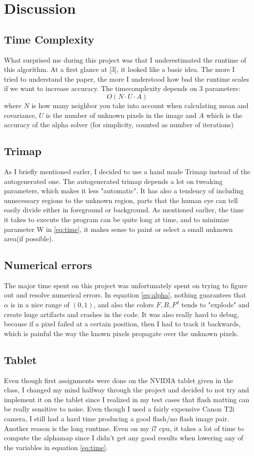 \documentclass[10pt,letterpaper,twocolumn]{article}
\begin{document}
\section{Discussion}
\subsection{Time Complexity}
What surprised me during this project was that I underestimated the runtime of this algorithm. At a first glance at [3], it looked like a basic idea. The more I tried to understand the paper, the more I understood how bad the runtime scales if we want to increase accuracy. The timecomplexity depends on 3 parameters:
	\begin{equation}
O(N\cdot U\cdot A)
\label{eq:time}
	\end{equation}
	where $N$ is how many neighbor you take into account when calculating mean and covariance, $U$ is the number of unknown pixels in the image and $A$ which is the accuracy of the alpha solver (for simplicity, counted as number of iterations)
\subsection{Trimap}
As I briefly mentioned earler, I decided to use a hand made Trimap instead of the autogenerated one. The autogenerated trimap depends a lot on tweaking parameters, which makes it less "automatic". It has also a tendency of including unnecessary regions to the unknown region, parts that the human eye can tell easily divide either in foreground or background. As mentioned earlier, the time it takes to execute the program can be quite long at time, and to minimize parameter W in \ref{eq:time}, it makes sense to paint or select a small unknown area(if possible).
\subsection{Numerical errors}
The major time spent on this project was unfortunately spent on trying to figure out and resolve numerical errors. In equation \ref{eq:alpha}, nothing guarantees that $\alpha$ is in a nice range of $(0,1)$, and also the colors $F,B,F^d$ tends to "explode" and create huge artifacts and crashes in the code. It was also really hard to debug, because if a pixel failed at a certain position, then I had to track it backwards, which is painful the way the known pixels propagate over the unknown pixels.
\subsection{Tablet}
Even though first assignments were done on the NVIDIA tablet given in the class, I changed my mind halfway through the project and decided to not try and implement it on the tablet since I realized in my test cases that flash matting can be really sensitive to noise. Even though I used a fairly expensive Canon T2i camera, I still had a hard time producing a good flash/no flash image pair. Another reason is the long runtime. Even on my i7 cpu, it takes a lot of time to compute the alphamap since I didn't get any good results when lowering any of the variables in equation \ref{eq:time}.
\end{document}

